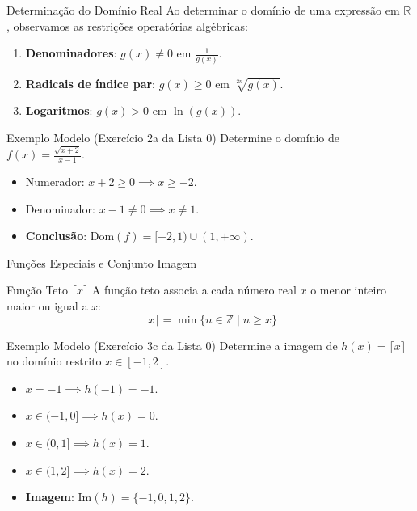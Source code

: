\documentclass[10pt, aspectratio=169]{beamer}
\begin{document}
\begin{frame}{Determinação do Domínio Real}
    Ao determinar o domínio de uma expressão em $\mathbb{R}$, observamos as restrições operatórias algébricas:
    \vspace{0.2cm}
    \begin{enumerate}
        \item \textbf{Denominadores}: $g(x) \neq 0$ em $\frac{1}{g(x)}$.
        \pause
        \item \textbf{Radicais de índice par}: $g(x) \ge 0$ em $\sqrt[2n]{g(x)}$.
        \pause
        \item \textbf{Logaritmos}: $g(x) > 0$ em $\ln(g(x))$.
    \end{enumerate}

    \pause
    \begin{block}{Exemplo Modelo (Exercício 2a da Lista 0)}
        Determine o domínio de $f(x) = \frac{\sqrt{x+2}}{x-1}$.
        \pause
        \begin{itemize}
            \item Numerador: $x + 2 \ge 0 \implies x \ge -2$.
            \pause
            \item Denominador: $x - 1 \neq 0 \implies x \neq 1$.
            \pause
            \item \textbf{Conclusão}: $\text{Dom}(f) = [-2, 1) \cup (1, +\infty)$.
        \end{itemize}
    \end{block}
\end{frame}

\begin{frame}{Funções Especiais e Conjunto Imagem}
    \begin{block}{Função Teto $\lceil x \rceil$}
        A função teto associa a cada número real $x$ o menor inteiro maior ou igual a $x$:
        $$\lceil x \rceil = \min\{n \in \mathbb{Z} \mid n \ge x\}$$
    \end{block}

    \pause
    \begin{exampleblock}{Exemplo Modelo (Exercício 3c da Lista 0)}
        Determine a imagem de $h(x) = \lceil x \rceil$ no domínio restrito $x \in [-1, 2]$.
        \pause
        \begin{itemize}
            \item $x = -1 \implies h(-1) = -1$.
            \pause
            \item $x \in (-1, 0] \implies h(x) = 0$.
            \pause
            \item $x \in (0, 1] \implies h(x) = 1$.
            \pause
            \item $x \in (1, 2] \implies h(x) = 2$.
            \pause
            \item \textbf{Imagem}: $\text{Im}(h) = \{-1, 0, 1, 2\}$.
        \end{itemize}
    \end{exampleblock}
\end{frame}
\end{document}

